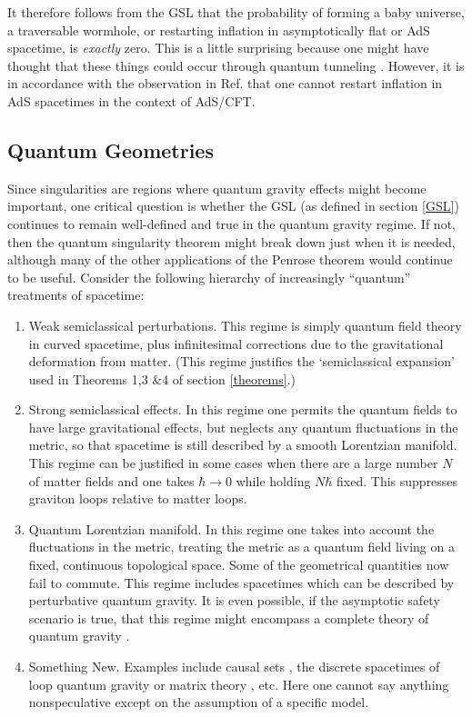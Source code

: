 \documentclass[12pt]{article}
\begin{document}
It therefore follows from the GSL that the probability of forming a baby universe, a traversable wormhole, or restarting inflation in asymptotically flat or AdS spacetime, is \emph{exactly} zero.  This is a little surprising because one might have thought that these things could occur through quantum tunneling \cite{bubble, monopole}.  However, it is in accordance with the observation in Ref. \cite{myers} that one cannot restart inflation in AdS spacetimes in the context of AdS/CFT.

\subsection{Quantum Geometries}\label{quantgeo}

Since singularities are regions where quantum gravity effects might become important, one critical question is whether the GSL (as defined in section \ref{GSL}) continues to remain well-defined and true in the quantum gravity regime.  If not, then the quantum singularity theorem might break down just when it is needed, although many of the other applications of the Penrose theorem would continue to be useful.  Consider the following hierarchy of increasingly ``quantum'' treatments of spacetime:
\begin{enumerate}
\item Weak semiclassical perturbations.  This regime is simply quantum field theory in curved spacetime, plus infinitesimal corrections due to the gravitational deformation from matter.  (This regime justifies the `semiclassical expansion' used in Theorems 1,3 \&4 of section \ref{theorems}.)

\item Strong semiclassical effects.  In this regime one permits the quantum fields to have large gravitational effects, but neglects any quantum fluctuations in the metric, so that spacetime is still described by a smooth Lorentzian manifold.  This regime can be justified in some cases when there are a large number $N$ of matter fields and one takes $\hbar \to 0$ while holding $N\hbar$ fixed.  This suppresses graviton loops relative to matter loops.

\item Quantum Lorentzian manifold.  In this regime one takes into account the fluctuations in the metric, treating the metric as a quantum field living on a fixed, continuous topological space.  Some of the geometrical quantities now fail to commute.  This regime includes spacetimes which can be described by perturbative quantum gravity.  It is even possible, if the asymptotic safety scenario is true, that this regime might encompass a complete theory of quantum gravity \cite{safety}.

\item Something New.  Examples include causal sets \cite{causal}, the discrete spacetimes of loop quantum gravity \cite{lqg} or matrix theory \cite{matrix}, etc.  Here one cannot say anything nonspeculative except on the assumption of a specific model.
\end{enumerate}
\end{document}
